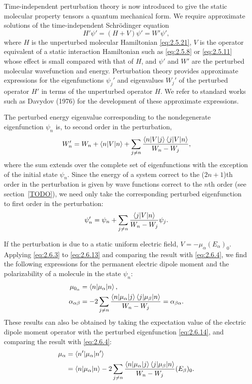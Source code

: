 \documentclass[%
class = book,%
crop = false,%
float = true,%
multi = true,%
preview = false,%
]{standalone}
\begin{document}
Time-independent perturbation theory is now introduced to give the static molecular property tensors a quantum mechanical form. We require approximate solutions of the time-independent Schr{\"{o}}dinger equation
\begin{equation}
  \label{eq:2.6.12}
  H' \psi ' = (H + V) \psi ' = W' \psi ',
\end{equation}
where \(H\) is the unperturbed molecular Hamiltonian \eqref{eq:2.5.21}, \(V\) is the operator equivalent of a static interaction Hamiltonian such as \eqref{eq:2.5.8} or \eqref{eq:2.5.11} whose effect is small compared with that of \(H\), and \(\psi '\) and \(W'\) are the perturbed molecular wavefunction and energy. Perturbation theory provides approximate expressions for the eigenfunctions \(\psi_{j}'\) and eigenvalues \(W_{j}'\) of the perturbed operator \(H'\) in terms of the unperturbed operator \(H\). We refer to standard works such as Davydov (1976) for the development of these approximate expressions.

The perturbed energy eigenvalue corresponding to the nondegenerate eigenfunction \(\psi_{n}\) is, to second order in the perturbation,
\begin{equation}
  \label{eq:2.6.13}
  W_{n}' = W_{n} + \braket{n|V|n} + \sum_{j \neq n} \frac{\braket{n|V|j}\braket{j|V|n}}{W_{n} - W_{j}},
\end{equation}
where the sum extends over the complete set of eigenfunctions with the exception of the initial state \(\psi_{n}\). Since the energy of a system correct to the (\(2n + 1\))th order in the perturbation is given by wave functions correct to the \(n\)th order (see section~\ref{TODO}), we need only take the corresponding perturbed eigenfunction to first order in the perturbation:
\begin{equation}
  \label{eq:2.6.14}
  \psi_{n}' = \psi_{n} + \sum_{j \neq n} \frac{\braket{j|V|n}}{W_{n} - W_{j}} \psi_{j}.
\end{equation}

If the perturbation is due to a static uniform electric field, \(V = -\mu_{\alpha}(E_{\alpha})_{0}\). Applying \eqref{eq:2.6.3} to \eqref{eq:2.6.13} and comparing the result with \eqref{eq:2.6.4}, we find the following expressions for the permanent electric dipole moment and the polarizability of a molecule in the state \(\psi_{n}\):
\begin{align}
  \mu_{0_{\alpha}} &= \braket{n|\mu_{\alpha}|n}, \\
  \alpha_{\alpha\beta} &= -2 \sum_{j \neq n} \frac{\braket{n|\mu_{\alpha}|j}\braket{j|\mu_{\beta}|n}}{W_{n} - W_{j}} = \alpha_{\beta\alpha}.
\end{align}
These results can also be obtained by taking the expectation value of the electric dipole moment operator with the perturbed eigenfunction \eqref{eq:2.6.14}, and comparing the result with \eqref{eq:2.6.4}:
\begin{align}
  \mu_{\alpha} &= \braket{n'|\mu_{\alpha}|n'} \\
               &= \braket{n|\mu_{\alpha}|n} -2 \sum_{j \neq n} \frac{\braket{n|\mu_{\alpha}|j}\braket{j|\mu_{\beta}|n}}{W_{n} - W_{j}} (E_{\beta})_{0}.
\end{align}
\end{document}
